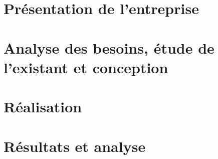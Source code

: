 \documentclass{gi}
\begin{document}
{}
\listoftables
\mtcaddchapter      %
\newpage


\mtcaddchapter      %
\newpage

\setcounter{page}{1}


\mtcaddchapter      %

\fancyhead[L]{\tiny \leftmark}
\fancyhead[R]{\scriptsize \rightmark}
\fancyfoot[C]{\thepage}

\chapter{Présentation de l'entreprise}\label{chap:1}


\chapter{Analyse des besoins, étude de l'existant et conception}\label{chap:2}


\chapter{Réalisation}\label{chap:3}


\chapter{Résultats et analyse}\label{chap:4}



\lhead[]{} \rhead[]{} \chead[]{}

\cleardoublepage
{}
{}
\nocite{*}


\end{document}
